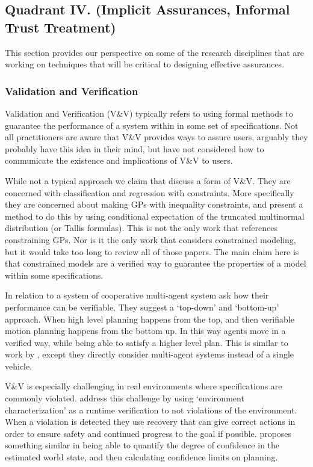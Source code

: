 \subsection{Quadrant IV. (Implicit Assurances, Informal Trust Treatment)}\label{sec:q4}
This section provides our perspective on some of the research disciplines that are working on techniques that will be critical to designing effective assurances.

\subsubsection{Validation and Verification}
    Validation and Verification (V\&V) typically refers to using formal methods to guarantee the performance of a system within in some set of specifications. Not all practitioners are aware that V\&V provides ways to assure users, arguably they probably have this idea in their mind, but have not considered how to communicate the existence and implications of V\&V to users.

    While not a typical approach we claim that \citet{Da_Veiga2012-gh} discuss a form of V\&V. They are concerned with classification and regression with constraints. More specifically they are concerned about making GPs with inequality constraints, and present a method to do this by using conditional expectation of the truncated multinormal distribution (or Tallis formulas). This is not the only work that references constraining GPs. Nor is it the only work that considers constrained modeling, but it would take too long to review all of those papers. The main claim here is that constrained models are a verified way to guarantee the properties of a model within some specifications.

    In relation to a system of cooperative multi-agent system \citet{Da_Silva2016-qb} ask how their performance can be verifiable. They suggest a `top-down' and `bottom-up' approach. When high level planning happens from the top, and then verifiable motion planning happens from the bottom up. In this way agents move in a verified way, while being able to satisfy a higher level plan. This is similar to work by \citet{Conner2007-uw}, except they directly consider multi-agent systems instead of a single vehicle.

    V\&V is especially challenging in real environments where specifications are commonly violated. \citet{Weng_Wong2014-tj} address this challenge by using `environment characterization' as a runtime verification to not violations of the environment. When a violation is detected they use recovery that can give correct actions in order to ensure safety and continued progress to the goal if possible. \citet{Nishi2016-zq} proposes something similar in being able to quantify the degree of confidence in the estimated world state, and then calculating confidence limits on planning.

